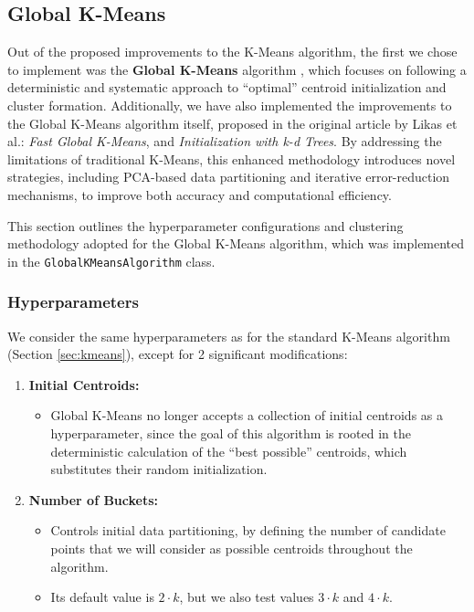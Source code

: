 \subsection{Global K-Means}
Out of the proposed improvements to the K-Means algorithm, the first we chose to implement was the \textbf{Global K-Means} algorithm \cite{Likas2003}, which focuses on following a deterministic and systematic approach to ``optimal'' centroid initialization and cluster formation. Additionally, we have also implemented the improvements to the Global K-Means algorithm itself, proposed in the original article by Likas et al.: \textit{Fast Global K-Means}, and \textit{Initialization with k-d Trees}. By addressing the limitations of traditional K-Means, this enhanced methodology introduces novel strategies, including PCA-based data partitioning and iterative error-reduction mechanisms, to improve both accuracy and computational efficiency.

This section outlines the hyperparameter configurations and clustering methodology adopted for the Global K-Means algorithm, which was implemented in the \texttt{GlobalKMeansAlgorithm} class.

\subsubsection{Hyperparameters}
We consider the same hyperparameters as for the standard K-Means algorithm (Section \ref{sec:kmeans}), except for 2 significant modifications:
\begin{enumerate}
    \item \textbf{Initial Centroids:}
    \begin{itemize}
        \item Global K-Means no longer accepts a collection of initial centroids as a hyperparameter, since the goal of this algorithm is rooted in the deterministic calculation of the ``best possible'' centroids, which substitutes their random initialization.
    \end{itemize}

    \item \textbf{Number of Buckets:}
    \begin{itemize}
        \item Controls initial data partitioning, by defining the number of candidate points that we will consider as possible centroids throughout the algorithm.
        \item Its default value is $2 \cdot k$, but we also test values $3 \cdot k$ and $4 \cdot k$.
    \end{itemize}
\end{enumerate}


